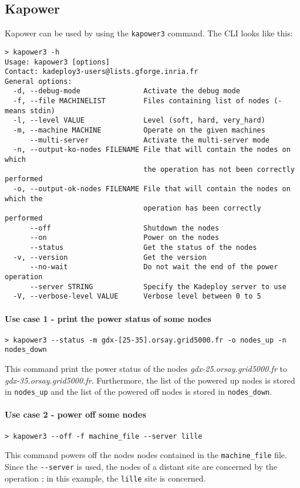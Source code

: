 \documentclass[a4wide,10pt,oneside]{book}
\begin{document}
\subsection{Kapower}\label{sec:kapower}
Kapower can be used by using the \texttt{kapower3} command. The CLI looks like this:
\begin{small}
\begin{verbatim}
> kapower3 -h
Usage: kapower3 [options]
Contact: kadeploy3-users@lists.gforge.inria.fr
General options:
  -d, --debug-mode               Activate the debug mode
  -f, --file MACHINELIST         Files containing list of nodes (- means stdin)
  -l, --level VALUE              Level (soft, hard, very_hard)
  -m, --machine MACHINE          Operate on the given machines
      --multi-server             Activate the multi-server mode
  -n, --output-ko-nodes FILENAME File that will contain the nodes on which
                                 the operation has not been correctly performed
  -o, --output-ok-nodes FILENAME File that will contain the nodes on which the
                                 operation has been correctly performed
      --off                      Shutdown the nodes
      --on                       Power on the nodes
      --status                   Get the status of the nodes
  -v, --version                  Get the version
      --no-wait                  Do not wait the end of the power operation
      --server STRING            Specify the Kadeploy server to use
  -V, --verbose-level VALUE      Verbose level between 0 to 5
\end{verbatim}
\end{small}

\paragraph{Use case 1 - print the power status of some nodes}
\begin{verbatim}
> kapower3 --status -m gdx-[25-35].orsay.grid5000.fr -o nodes_up -n nodes_down
\end{verbatim}
This command print the power status of the nodes \textit{gdx-25.orsay.grid5000.fr} to \textit{gdx-35.orsay.grid5000.fr}. Furthermore, the list of the powered up nodes is stored in \texttt{nodes\_up} and the list of the powered off nodes is stored in \texttt{nodes\_down}.

\paragraph{Use case 2 - power off some nodes}
\begin{verbatim}
> kapower3 --off -f machine_file --server lille
\end{verbatim}
This command powers off the nodes nodes contained in the \texttt{machine\_file} file. Since the \texttt{-{}-server} is used, the nodes of a distant site are concerned by the operation ; in this example, the \texttt{lille} site is concerned.
\end{document}
